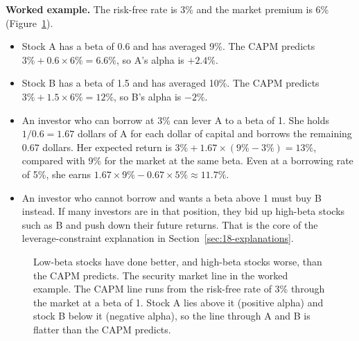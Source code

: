 \textbf{Worked example.} The risk-free rate is 3\% and the market premium is 6\% (Figure~\ref{fig:18-sml}).

\begin{itemize}
  \item Stock A has a beta of 0.6 and has averaged 9\%. The CAPM predicts $3\% + 0.6 \times 6\% = 6.6\%$, so A's alpha is $+2.4\%$.
  \item Stock B has a beta of 1.5 and has averaged 10\%. The CAPM predicts $3\% + 1.5 \times 6\% = 12\%$, so B's alpha is $-2\%$.
  \item An investor who can borrow at 3\% can lever A to a beta of 1. She holds $1/0.6 = 1.67$ dollars of A for each dollar of capital and borrows the remaining 0.67 dollars. Her expected return is $3\% + 1.67 \times (9\% - 3\%) = 13\%$, compared with 9\% for the market at the same beta. Even at a borrowing rate of 5\%, she earns $1.67 \times 9\% - 0.67 \times 5\% \approx 11.7\%$.
  \item An investor who cannot borrow and wants a beta above 1 must buy B instead. If many investors are in that position, they bid up high-beta stocks such as B and push down their future returns. That is the core of the leverage-constraint explanation in Section~\ref{sec:18-explanations}.
\end{itemize}

\begin{figure}[htbp]
\centering
{}
\caption{Low-beta stocks have done better, and high-beta stocks worse, than the CAPM predicts. The security market line in the worked example. The CAPM line runs from the risk-free rate of 3\% through the market at a beta of 1. Stock A lies above it (positive alpha) and stock B below it (negative alpha), so the line through A and B is flatter than the CAPM predicts.}
\label{fig:18-sml}
\end{figure}


